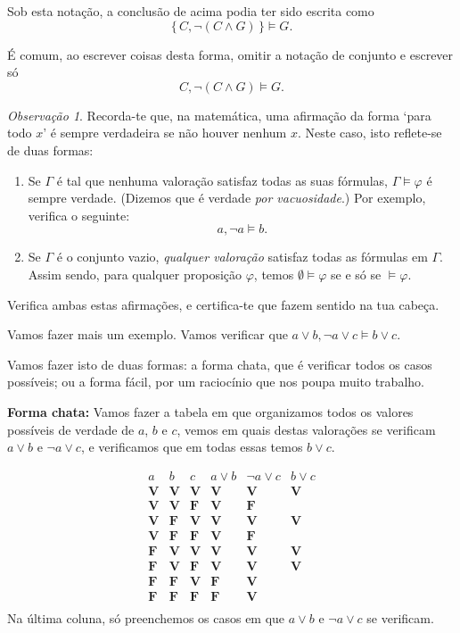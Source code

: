 \documentclass{article}
\theoremstyle{definition}
\theoremstyle{remark}
\newtheorem{obs}{Observação}
\newcommand{\V}{\mathbf{V}}
\newcommand{\F}{\mathbf{F}}
\begin{document}
	Sob esta notação, a conclusão de acima podia ter sido escrita como
	\[\{\, C, \neg(C \land G) \,\} \vDash G.\]
	
	É comum, ao escrever coisas desta forma, omitir a notação de conjunto e escrever só
	\[C, \neg(C \land G) \vDash G.\]
	
	\begin{obs}
	Recorda-te que, na matemática, uma afirmação da forma `para todo $x$' é sempre verdadeira se não houver nenhum $x$. Neste caso, isto reflete-se de duas formas:
	
	\begin{enumerate}
	\item Se $\Gamma$ é tal que nenhuma valoração satisfaz todas as suas fórmulas, $\Gamma \vDash \varphi$ é sempre verdade. (Dizemos que é verdade \emph{por vacuosidade}.) Por exemplo, verifica o seguinte:
	\[ a, \neg a \vDash b.\]
	
	\item Se $\Gamma$ é o conjunto vazio, \emph{qualquer valoração} satisfaz todas as fórmulas em $\Gamma$. Assim sendo, para qualquer proposição $\varphi$, temos $\emptyset \vDash \varphi$ se e só se $\vDash \varphi$.
	\end{enumerate}
	
	Verifica ambas estas afirmações, e certifica-te que fazem sentido na tua cabeça.
	\end{obs}
	
	Vamos fazer mais um exemplo. Vamos verificar que $a \lor b, \neg a \lor c \vDash b \lor c$.
	
	Vamos fazer isto de duas formas: a forma chata, que é verificar todos os casos possíveis; ou a forma fácil, por um raciocínio que nos poupa muito trabalho.
	
	\textbf{Forma chata:} Vamos fazer a tabela em que organizamos todos os valores possíveis de verdade de $a$, $b$ e $c$, vemos em quais destas valorações se verificam $a \lor b$ e $\neg a \lor c$, e verificamos que em todas essas temos $b \lor c$.
	
	\[
	\begin{array}{c|c|c|c|c|c}
	a&b&c&a\lor b&\neg a \lor c& b \lor c\\
	\hline
	\V&\V&\V&\V&\V&\V\\
	\V&\V&\F&\V&\F&\\
	\V&\F&\V&\V&\V&\V\\
	\V&\F&\F&\V&\F&\\
	\F&\V&\V&\V&\V&\V\\
	\F&\V&\F&\V&\V&\V\\
	\F&\F&\V&\F&\V&\\
	\F&\F&\F&\F&\V&\\
	\end{array}
	\]
	Na última coluna, só preenchemos os casos em que $a\lor b$ e $\neg a \lor c$ se verificam.
	
\end{document}
